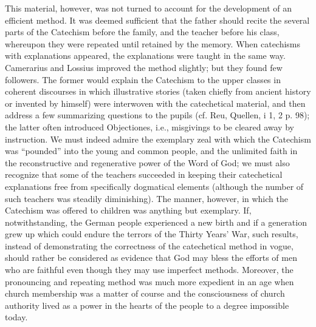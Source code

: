 This material, however, was not turned to account for the development of an efficient method. It was deemed sufficient that the father should recite the several parts of the Catechism before the family, and the teacher before his class, whereupon they were repeated until retained by the memory. When catechisms with explanations appeared, the explanations were taught in the same way. Camerarius and Lossius improved the method slightly; but they found few
followers. The former would explain the Catechism to the upper classes in coherent discourses in which illustrative stories (taken chiefly from ancient history or invented by himself) were interwoven with the catechetical material, and then address a few summarizing questions to the pupils (cf. Reu, Quellen, i 1, 2 p. 98); the latter often introduced Objectiones, i.e., misgivings to be cleared away by instruction. We must indeed admire the exemplary zeal with which the Catechism was “pounded” into the young and common people, and the unlimited faith in the reconstructive and regenerative power of the Word of God; we must also recognize that some of the teachers succeeded in keeping their catechetical explanations free from specifically dogmatical elements (although the number of such teachers was steadily diminishing). The manner, however, in which the Catechism was offered to children was anything but exemplary. If, notwithstanding, the German people experienced a new birth and if a generation grew up which could endure the terrors of the Thirty Years’ War, such results, instead of demonstrating the correctness of the catechetical method in vogue, should rather be considered as evidence that God may bless the efforts of men who are faithful even though they may use imperfect methods. Moreover, the pronouncing and repeating method was much more expedient in an age when church membership was a matter of course and the consciousness of church authority lived as a power in the hearts of the people to a degree impossible today.

